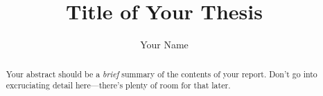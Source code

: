 \documentclass{hmcthesis}
\title{Title of Your Thesis}
\author{Your Name}
\begin{document}

\frontmatter




\maketitle



\begin{abstract}
  Your abstract should be a \emph{brief} summary of the contents of
  your report.  Don't go into excruciating detail here---there's
  plenty of room for that later.
\end{abstract}



\tableofcontents
\listoffigures
\listoftables




\begin{acknowledgments}
\end{acknowledgments}




\end{document}
